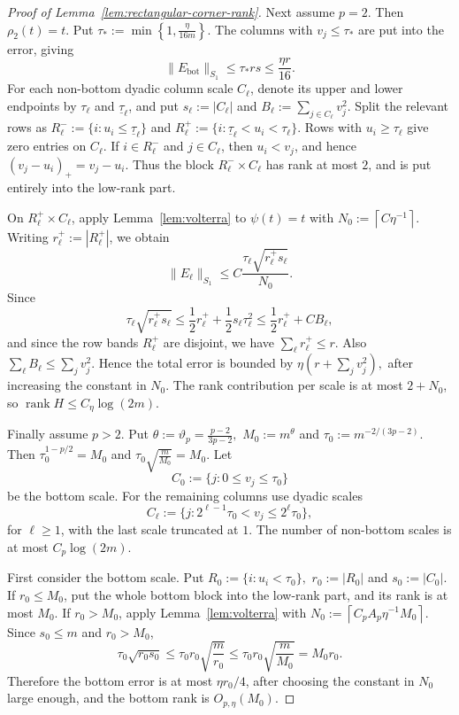 \documentclass[11pt]{article}
\theoremstyle{definition}
\begin{document}
\begin{proof}[Proof of Lemma~\ref{lem:rectangular-corner-rank}]
Next assume \(p=2\). Then \(\rho_2(t)=t\). Put
\(
\tau_*:=\min\left\{1,\frac{\eta}{16m}\right\}.
\)
The columns with \(v_j\le\tau_*\) are put into the error, giving
\[
\|E_{\mathrm{bot}}\|_{S_1}
\le
\tau_*rs
\le
\frac{\eta r}{16}.
\]
For each non-bottom dyadic column scale \(C_\ell\), denote its upper and lower endpoints by \(\tau_\ell\) and \(\underline{\tau}_\ell\), and put \( s_\ell:=|C_\ell|\) and \(B_\ell:=\sum_{j\in C_\ell}v_j^2.\) Split the relevant rows as
\(
R_\ell^-:=\{i:u_i\le\underline{\tau}_\ell\}\)
and \(
R_\ell^+:=\{i:\underline{\tau}_\ell<u_i<\tau_\ell\}.
\)
Rows with \(u_i\ge\tau_\ell\) give zero entries on \(C_\ell\). If
\(i\in R_\ell^-\) and \(j\in C_\ell\), then \(u_i<v_j\), and hence
\(
(v_j-u_i)_+=v_j-u_i.
\)
Thus the block \(R_\ell^-\times C_\ell\) has rank at most \(2\), and is put
entirely into the low-rank part.

On \(R_\ell^+\times C_\ell\), apply Lemma~\ref{lem:volterra} to \(\psi(t)=t\) with
\(
N_0:=\left\lceil C\eta^{-1}\right\rceil.
\)
Writing \(r_\ell^+:=|R_\ell^+|\), we obtain
\[
\|E_\ell\|_{S_1}
\le
C\frac{\tau_\ell\sqrt{r_\ell^+s_\ell}}{N_0}.
\]
Since
\[
\tau_\ell\sqrt{r_\ell^+s_\ell}
\le
\frac12r_\ell^+ + \frac12s_\ell\tau_\ell^2
\le
\frac12r_\ell^+ + C B_\ell,
\]
and since the row bands \(R_\ell^+\) are disjoint, we have
\(
\sum_\ell r_\ell^+\le r.
\)
Also \(\sum_\ell B_\ell\le\sum_jv_j^2\). Hence the total error is bounded by
\(
\eta\left(r+\sum_jv_j^2\right),
\)
after increasing the constant in \(N_0\). The rank contribution per scale is at
most \(2+N_0\), so
\(
\operatorname{rank}H\le C_\eta\log(2m).
\)

Finally assume \(p>2\). Put
\(
\theta:=\vartheta_p=\frac{p-2}{3p-2},\)
\(
M_0:=m^\theta\) and
\(
\tau_0:=m^{-2/(3p-2)}.
\)
Then
\(
\tau_0^{1-p/2}=M_0\) and
\(
\tau_0\sqrt{\frac{m}{M_0}}=M_0.
\)
Let
\[
C_0:=\{j:0\le v_j\le\tau_0\}
\]
be the bottom scale. For the remaining columns use dyadic scales
\[
C_\ell:=\{j:2^{\ell-1}\tau_0<v_j\le2^\ell\tau_0\},
\]
for \(\ell\ge1\), with the last scale truncated at \(1\). The number of non-bottom scales is at
most \(C_p\log(2m)\).

First consider the bottom scale. Put
\(
R_0:=\{i:u_i<\tau_0\},\)
\(
r_0:=|R_0|\)
and
\(
s_0:=|C_0|.
\)
If \(r_0\le M_0\), put the whole bottom block into the low-rank part, and its rank is
at most \(M_0\). If \(r_0>M_0\), apply Lemma~\ref{lem:volterra} with
\(
N_0:=\left\lceil C_pA_p\eta^{-1}M_0\right\rceil.
\)
Since \(s_0\le m\) and \(r_0>M_0\),
\[
\tau_0\sqrt{r_0s_0}
\le
\tau_0r_0\sqrt{\frac{m}{r_0}}
\le
\tau_0r_0\sqrt{\frac{m}{M_0}}
=
M_0r_0.
\]
Therefore the bottom error is at most \(\eta r_0/4\), after choosing the constant
in \(N_0\) large enough, and the bottom rank is \(O_{p,\eta}(M_0)\).


\end{proof}
\end{document}
